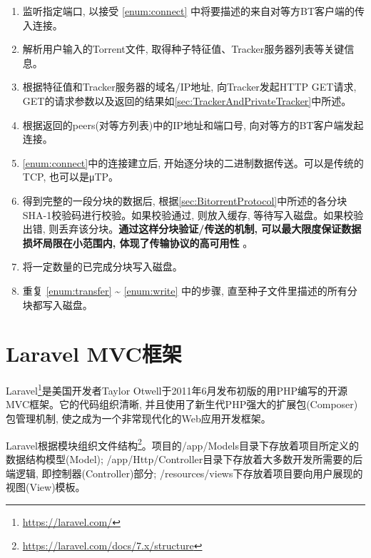 \begin{enumerate}[label=(\arabic*),leftmargin=*]
\item 监听指定端口, 以接受 \ref{enum:connect} 中将要描述的来自对等方BT客户端的传入连接。

\item 解析用户输入的Torrent文件, 取得种子特征值、Tracker服务器列表等关键信息。

\item 根据特征值和Tracker服务器的域名/IP地址, 向Tracker发起HTTP GET请求, GET的请求参数以及返回的结果如\ref{sec:TrackerAndPrivateTracker}中所述。

\item \label{enum:connect}根据返回的peers(对等方列表)中的IP地址和端口号, 向对等方的BT客户端发起连接。

\item \label{enum:transfer} \ref{enum:connect}中的连接建立后, 开始逐分块的二进制数据传送。可以是传统的TCP, 也可以是μTP。

\item 得到完整的一段分块的数据后, 根据\ref{sec:BitorrentProtocol}中所述的各分块SHA-1校验码进行校验。如果校验通过, 则放入缓存, 等待写入磁盘。如果校验出错, 则丢弃该分块。\textbf{通过这样分块验证/传送的机制, 可以最大限度保证数据损坏局限在小范围内, 体现了传输协议的高可用性}
。

\item \label{enum:write}将一定数量的已完成分块写入磁盘。

\item 重复 \ref{enum:transfer} \~{} \ref{enum:write} 中的步骤, 直至种子文件里描述的所有分块都写入磁盘。
\end{enumerate}




\section{Laravel MVC框架}
\label{sec:Larvel}

Laravel\footnote{\url{https://laravel.com/}}是美国开发者Taylor Otwell于2011年6月发布初版的用PHP编写的开源MVC框架。它的代码组织清晰, 并且使用了新生代PHP强大的扩展包(Composer)包管理机制, 使之成为一个非常现代化的Web应用开发框架。

Laravel根据模块组织文件结构\footnote{\url{https://laravel.com/docs/7.x/structure}}。项目的/app/Models目录下存放着项目所定义的数据结构模型(Model); /app/Http/Controller目录下存放着大多数开发所需要的后端逻辑, 即控制器(Controller)部分; /resources/views下存放着项目要向用户展现的视图(View)模板。

